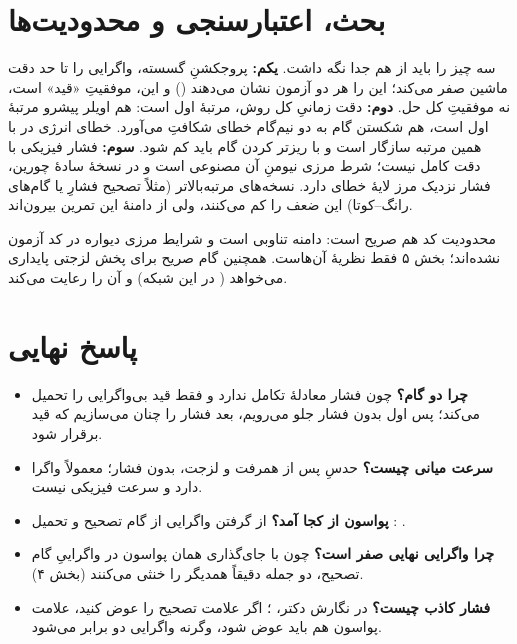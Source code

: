 \documentclass[12pt,a4paper]{article}
\begin{document}
\section{بحث، اعتبارسنجی و محدودیت‌ها}
سه چیز را باید از هم جدا نگه داشت. \textbf{یکم:} پروجکشنِ گسسته، واگرایی
را تا حد دقت ماشین صفر می‌کند؛ این را هر دو آزمون نشان می‌دهند
() و این، موفقیتِ «قید» است، نه موفقیتِ کل حل.
\textbf{دوم:} دقت زمانیِ کل روش، مرتبهٔ اول است: هم اویلر پیشرو مرتبهٔ
اول است، هم شکستن گام به دو نیم‌گام خطای شکافتِ 
می‌آورد. خطای انرژی  در 
با همین مرتبه سازگار است و با ریزتر کردن گام باید کم شود.
\textbf{سوم:} \lr{$\pi$} فشار فیزیکی با دقت کامل نیست؛ شرط مرزی نیومنِ
آن مصنوعی است و در نسخهٔ سادهٔ چورین، فشار نزدیک مرز لایهٔ خطای
 دارد. نسخه‌های مرتبه‌بالاتر (مثلاً تصحیح فشارِ
 یا گام‌های رانگ--کوتا) این ضعف را کم می‌کنند، ولی از
دامنهٔ این تمرین بیرون‌اند.

محدودیت کد هم صریح است: دامنه تناوبی است و شرایط مرزی دیواره در کد
آزمون نشده‌اند؛ بخش ۵ فقط نظریهٔ آن‌هاست. همچنین گام صریح برای پخش
لزجتی پایداری می‌خواهد (
در این شبکه) و  آن را رعایت می‌کند.

\section{پاسخ نهایی}
\begin{itemize}
\item \textbf{چرا دو گام؟} چون فشار معادلهٔ تکامل ندارد و فقط قید
بی‌واگرایی را تحمیل می‌کند؛ پس اول بدون فشار جلو می‌رویم، بعد فشار
را چنان می‌سازیم که قید برقرار شود.
\item \textbf{سرعت میانی چیست؟} حدسِ پس از همرفت و لزجت، بدون فشار؛
معمولاً واگرا دارد و سرعت فیزیکی نیست.
\item \textbf{پواسون از کجا آمد؟} از گرفتن واگرایی از گام تصحیح و تحمیل
: 
.
\item \textbf{چرا واگرایی نهایی صفر است؟} چون با جای‌گذاری همان پواسون
در واگراییِ گام تصحیح، دو جمله دقیقاً همدیگر را خنثی می‌کنند (بخش ۴).
\item \textbf{فشار کاذب چیست؟} در نگارش دکتر، ؛ اگر
علامت تصحیح را عوض کنید، علامت پواسون هم باید عوض شود، وگرنه واگرایی
دو برابر می‌شود.
\end{itemize}
\end{document}
